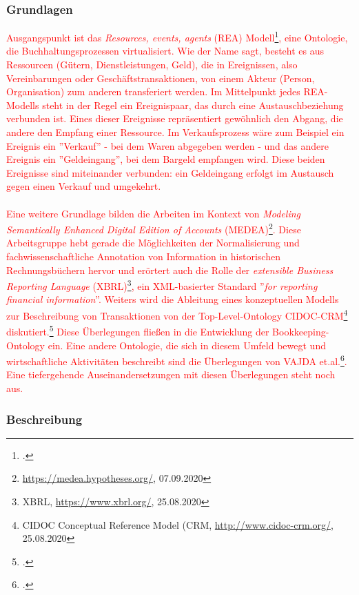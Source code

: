 \documentclass[12pt,a4paper]{article}
\begin{document}
\subsubsection{Grundlagen}
\textcolor{red}{
Ausgangspunkt ist das \textit{Resources, events, agents} (REA) Modell\footcite{mccarthy1982rea}, eine Ontologie, die Buchhaltungsprozessen virtualisiert. Wie der Name sagt, besteht es aus Ressourcen (Gütern, Dienstleistungen, Geld), die in Ereignissen, also Vereinbarungen oder Geschäftstransaktionen, von einem Akteur (Person, Organisation) zum anderen transferiert werden. Im Mittelpunkt jedes REA-Modells steht in der Regel ein Ereignispaar, das durch eine Austauschbeziehung verbunden ist. Eines dieser Ereignisse repräsentiert gewöhnlich den Abgang, die andere den Empfang einer Ressource. Im Verkaufsprozess wäre zum Beispiel ein Ereignis ein ''Verkauf'' - bei dem Waren abgegeben werden - und das andere Ereignis ein ''Geldeingang'', bei dem Bargeld empfangen wird. Diese beiden Ereignisse sind miteinander verbunden: ein Geldeingang erfolgt im Austausch gegen einen Verkauf und umgekehrt.
\\
\\
Eine weitere Grundlage bilden die Arbeiten im Kontext von \textit{Modeling Semantically Enhanced Digital Edition of Accounts} (MEDEA)\footnote{\url{https://medea.hypotheses.org/}, 07.09.2020}. Diese Arbeitsgruppe hebt gerade die Möglichkeiten der Normalisierung und fachwissenschaftliche Annotation von Information in historischen Rechnungsbüchern hervor und erörtert auch die Rolle der \textit{extensible Business Reporting Language} (XBRL)\footnote{XBRL, \url{https://www.xbrl.org/}, 25.08.2020}, ein XML-basierter Standard ''\textit{for reporting financial information}''. Weiters wird die Ableitung eines konzeptuellen Modells zur Beschreibung von Transaktionen von der Top-Level-Ontology CIDOC-CRM\footnote{CIDOC Conceptual Reference Model (CRM, \url{http://www.cidoc-crm.org/}, 25.08.2020} diskutiert.\footcite[][S.9-12]{tomasekmedea} Diese Überlegungen fließen in die Entwicklung der Bookkeeping-Ontology ein. Eine andere Ontologie, die sich in diesem Umfeld bewegt und wirtschaftliche Aktivitäten beschreibt sind die Überlegungen von VAJDA et.al.\footcite[][]{vajda2019toward}. Eine tiefergehende Auseinandersetzungen mit diesen Überlegungen steht noch aus.
}

\subsubsection{Beschreibung}
\end{document}
